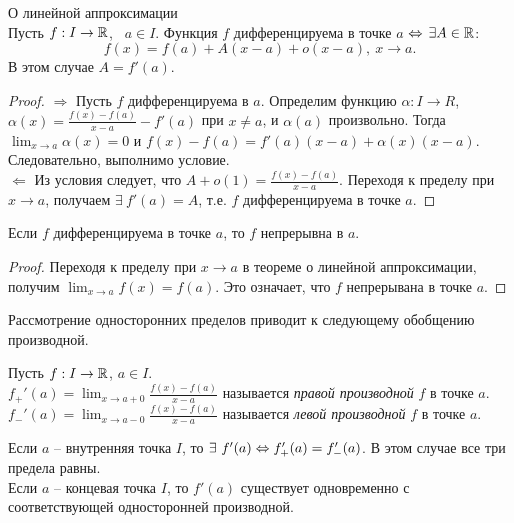     \begin{theorem}{О линейной аппроксимации}\\
        Пусть $f: I \to \mathbb{R}$, \ $a \in I$.
        Функция $f$ дифференцируема в точке $a$ $\Leftrightarrow$ $\exists A \in \mathbb{R}$:
        \[f(x) = f(a) + A(x - a) + o(x - a), \ x \to a.\]
        В этом случае $A = f'(a)$.
    \end{theorem}
    
    \begin{proof}
        $\Rightarrow$ Пусть $f$ дифференцируема в $a$. Определим функцию $\alpha: I \rightarrow R$, $\alpha(x) = \frac{f(x) - f(a)}{x - a} - f'(a)$ при $ x \neq a$, и $\alpha(a)$ произвольно.
        Тогда $\lim_{x \to a} \alpha(x) = 0$ и $f(x) - f(a) = f'(a)(x - a) + \alpha(x)(x - a)$. Следовательно, выполнимо условие.
        \\
        $\Leftarrow$ Из условия следует, что $A + o(1) = \frac{f(x) - f(a)}{x - a}$. Переходя к пределу при $x \to a$, получаем $\exists \ f'(a) = A$, т.е. $f$ дифференцируема в точке $a$.
    \end{proof}
    
    \begin{corollary}
        Если $f$ дифференцируема в точке $a$, то $f$ непрерывна в $a$.
    \end{corollary}
    
    \begin{proof}
        Переходя к пределу при $x \to a$ в теореме о линейной аппроксимации, получим $\lim_{x \to a} f(x) = f(a)$. Это означает, что $f$ непрерывана в точке $a$.
    \end{proof}
    
    Рассмотрение односторонних пределов приводит к следующему обобщению производной.
    
    \begin{definition}
        Пусть $f: I \to \mathbb{R}$, $a \in I$.
        \\
        $f_{+}'(a) = \lim_{x \to a + 0} \frac{f(x) - f(a)}{x - a}$ называется \textit{правой производной} $f$ в точке $a$.
        \\
        $f_{-}'(a) = \lim_{x \to a - 0} \frac{f(x) - f(a)}{x - a}$ называется \textit{левой производной} $f$ в точке $a$.
    \end{definition}
    
    \begin{note}
        Если $a$ -- внутренняя точка $I$, то $\exists \ f'(a) \Leftrightarrow f_{+}'(a) = f_{-}'(a)$. В этом случае все три предела равны.
        \\
        Если $a$ -- концевая точка $I$, то $f'(a)$ существует одновременно с соответствующей односторонней производной.
    \end{note}
    
